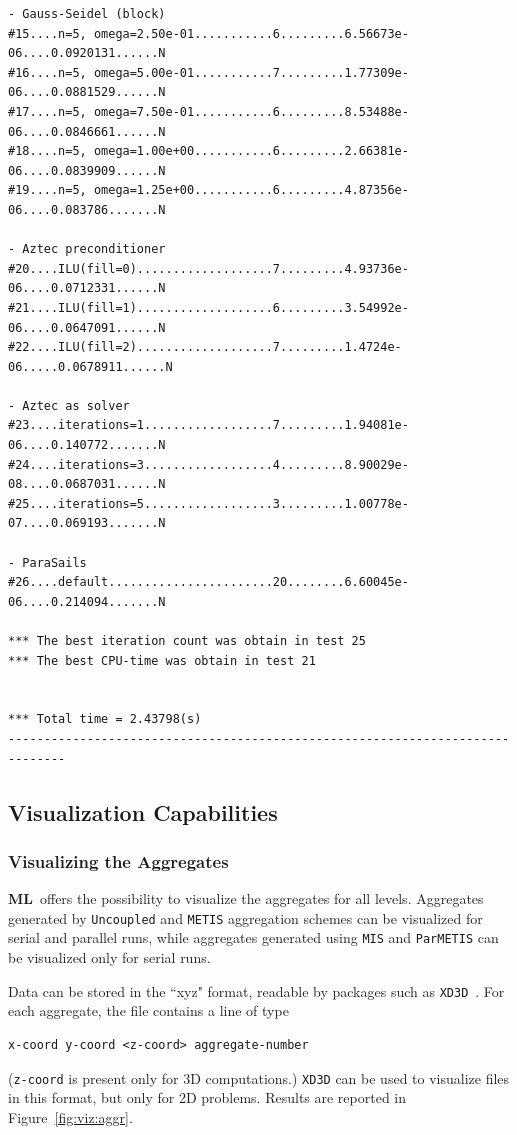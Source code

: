 \documentclass{article}[11pt]
\newcommand{\ML}     {{\bf ML}}
\begin{document}
\begin{verbatim}
- Gauss-Seidel (block)
#15....n=5, omega=2.50e-01...........6.........6.56673e-06....0.0920131......N
#16....n=5, omega=5.00e-01...........7.........1.77309e-06....0.0881529......N
#17....n=5, omega=7.50e-01...........6.........8.53488e-06....0.0846661......N
#18....n=5, omega=1.00e+00...........6.........2.66381e-06....0.0839909......N
#19....n=5, omega=1.25e+00...........6.........4.87356e-06....0.083786.......N

- Aztec preconditioner
#20....ILU(fill=0)...................7.........4.93736e-06....0.0712331......N
#21....ILU(fill=1)...................6.........3.54992e-06....0.0647091......N
#22....ILU(fill=2)...................7.........1.4724e-06.....0.0678911......N

- Aztec as solver
#23....iterations=1..................7.........1.94081e-06....0.140772.......N
#24....iterations=3..................4.........8.90029e-08....0.0687031......N
#25....iterations=5..................3.........1.00778e-07....0.069193.......N

- ParaSails
#26....default.......................20........6.60045e-06....0.214094.......N

*** The best iteration count was obtain in test 25
*** The best CPU-time was obtain in test 21


*** Total time = 2.43798(s)
------------------------------------------------------------------------------
\end{verbatim}


\subsection{Visualization Capabilities}

\subsubsection{Visualizing the Aggregates}
\label{sec:viz:aggre}

\ML~offers the possibility to visualize the aggregates for all levels. 
Aggregates generated by {\tt Uncoupled} and {\tt METIS} aggregation schemes
can be visualized for serial and parallel runs, while aggregates generated
using {\tt MIS} and {\tt ParMETIS} can be visualized only for serial runs.

Data can be stored in the ``xyz" format, readable by packages such as
\verb!XD3D!~\cite{xd3d-home-page}.
For each aggregate, the file contains a line of type
\begin{verbatim}
x-coord y-coord <z-coord> aggregate-number
\end{verbatim}
(\verb!z-coord! is present only for 3D computations.) 
\verb!XD3D! can be used to visualize files in this format, but only for 2D
problems.
Results are reported in Figure~\ref{fig:viz:aggr}.
\end{document}
